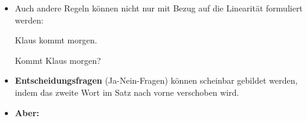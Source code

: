 \begin{frame}

\begin{itemize}
	\item Auch andere Regeln können nicht nur mit Bezug auf die Linearität formuliert werden:
	
	\settowidth{}
	\ea Klaus kommt morgen. 
	\z

	\ea Kommt Klaus morgen? 
	\z
	
	\item \textbf{Entscheidungsfragen} (Ja-Nein-Fragen) können scheinbar gebildet werden, indem das zweite Wort im Satz nach vorne verschoben wird.\\

\pause
	
	\item[] \textbf{Aber:}
	
	

\z
	
\end{itemize}

\end{frame}


